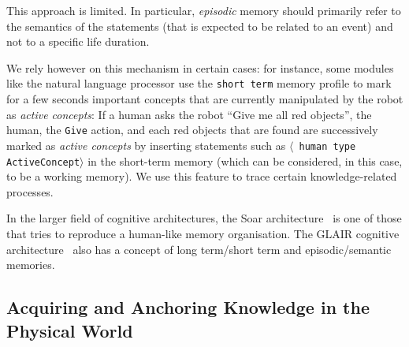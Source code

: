 \documentclass[preprint,3p,times]{elsarticle}
\newcommand{\concept}[1]{{\small \texttt{#1}}}
\newcommand{\stmt}[1]{{\footnotesize \tt $\langle$ #1\relax$\rangle$}}
\begin{document}
This approach is limited. In particular, \emph{episodic} memory should primarily
refer to the semantics of the statements (that is expected to be related to an
event) and not to a specific life duration.

We rely however on this mechanism in certain cases: for instance, some modules
like the natural language processor use the {\tt short term} memory profile to
mark for a few seconds important concepts that are currently manipulated by the
robot as \emph{active concepts}: If a human asks the robot ``Give
me all red objects'', the human, the \concept{Give} action, and each red
objects that are found are successively marked as \emph{active concepts} by
inserting statements such as \stmt{human type ActiveConcept} in the short-term
memory (which can be considered, in this case, to be a working memory). We use
this feature to trace certain knowledge-related processes.

In the larger field of cognitive architectures, the {\sc Soar}
architecture~\cite{Lehman2006} is one of those that tries to reproduce a
human-like memory organisation. The GLAIR cognitive
architecture~\cite{Shapiro2009} also has a concept of long term/short term and
episodic/semantic memories.


\subsection{Acquiring and Anchoring Knowledge in the Physical World}
\label{sect|sit-ass}
\end{document}
